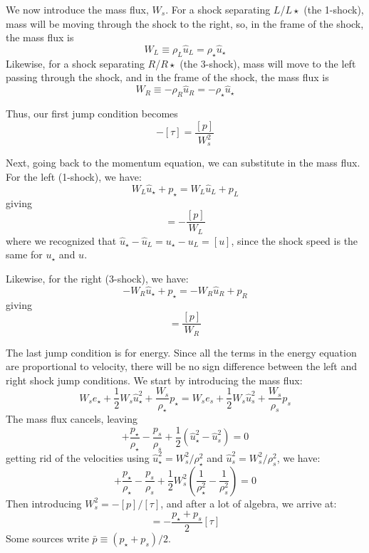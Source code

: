 We now introduce the mass flux, $W_s$.  For a shock separating
$L$/$L\star$ (the 1-shock), mass will be moving through the shock to the
right, so, in the frame of the shock, the mass flux is
\begin{equation}
W_L \equiv \rho_L \hat{u}_L = \rho_\star \hat{u}_\star
\end{equation}
Likewise, for a shock separating $R$/$R\star$ (the 3-shock), mass will
move to the left passing through the shock, and in the frame of the
shock, the mass flux is
\begin{equation}
W_R \equiv -\rho_R \hat{u}_R = -\rho_\star \hat{u}_\star
\end{equation}

Thus, our first jump condition becomes
\begin{equation}
-[\tau] = \frac{[p]}{W_s^2}
\end{equation}

Next, going back to the momentum equation, we can substitute in the
mass flux.  For the left (1-shock), we have:
\begin{equation}
W_L \hat{u}_\star + p_\star = W_L \hat{u}_L + p_L
\end{equation}
giving
\begin{equation}
[u] = -\frac{[p]}{W_L}
\end{equation}
where we recognized that $\hat{u}_\star - \hat{u}_L = u_\star - u_L =
[u]$, since the shock speed is the same for $u_\star$ and $u$.

Likewise, for the right (3-shock), we have:
\begin{equation}
-W_R \hat{u}_\star + p_\star = -W_R \hat{u}_R + p_R
\end{equation}
giving
\begin{equation}
[u] = \frac{[p]}{W_R}
\end{equation}

The last jump condition is for energy.  Since all the terms in the
energy equation are proportional to velocity, there will be no sign
difference between the left and right shock jump conditions.
We start by introducing the mass flux:
\begin{equation}
W_s e_\star + \frac{1}{2} W_s \hat{u}_\star^2 + \frac{W_s}{\rho_\star} p_\star =
  W_s e_s + \frac{1}{2} W_s \hat{u}_s^2 + \frac{W_s}{\rho_s} p_s
\end{equation}
The mass flux cancels, leaving
\begin{equation}
[e] + \frac{p_\star}{\rho_\star} - \frac{p_s}{\rho_s} + \frac{1}{2} \left ( \hat{u}_\star^2 - \hat{u}_s^2 \right ) = 0
\end{equation}
getting rid of the velocities using $\hat{u}_\star^2 = W_s^2/\rho_\star^2$ and
$\hat{u}_s^2 = W_s^2/\rho_s^2$, we have:
\begin{equation}
[e] + \frac{p_\star}{\rho_\star} - \frac{p_s}{\rho_s} + \frac{1}{2} W_s^2 \left ( \frac{1}{\rho_\star^2} - \frac{1}{\rho_s^2} \right ) = 0
\end{equation}
Then introducing $W_s^2 = -[p]/[\tau]$, and after a lot of algebra, we arrive at:
\begin{equation}
[e] = -\frac{p_\star + p_s}{2} [\tau]
\end{equation}
Some sources write $\bar{p} \equiv (p_\star + p_s)/2$.

